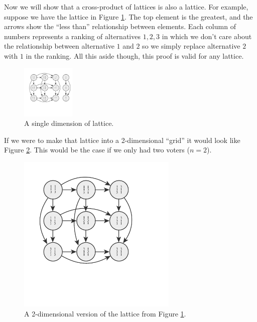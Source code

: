	Now we will show that a cross-product of lattices is also a lattice. For example, suppose we have the lattice in Figure \ref{figure-one-dimensional-lattice}. The top element is the greatest, and the arrows show the ``less than'' relationship between elements. Each column of numbers represents a ranking of alternatives ${1, 2, 3}$ in which we don't care about the relationship between alternative $1$ and $2$ so we simply replace alternative $2$ with $1$ in the ranking. All this aside though, this proof is valid for any lattice.

	\begin{figure}[ht]
		\begin{center}
			\includegraphics[width=1in]{../figures/diagram5.pdf}
			\caption{A single dimension of lattice.}
			\label{figure-one-dimensional-lattice}
		\end{center}
	\end{figure}

	If we were to make that lattice into a 2-dimensional ``grid'' it would look like Figure \ref{figure-two-dimensional-lattice}. This would be the case if we only had two voters ($n = 2$).

	\begin{figure}[ht]
		\begin{center}
			\includegraphics[width=3in]{../figures/diagram6.pdf}
			\caption{A 2-dimensional version of the lattice from Figure \ref{figure-one-dimensional-lattice}.}
			\label{figure-two-dimensional-lattice}
		\end{center}
	\end{figure}

